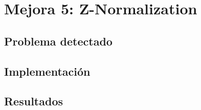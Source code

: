 \chapter{Mejora 5: Z-Normalization}\label{apex}

\section{Problema detectado}\label{sec:apex_problem}

\section{Implementación}\label{sec:apex_implementation}

\section{Resultados}\label{sec:apex_resultados}
